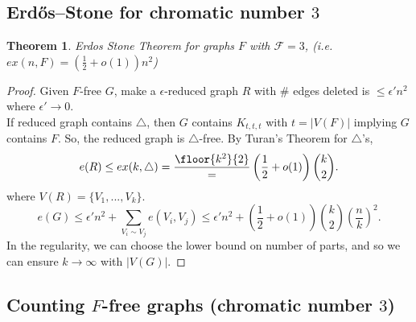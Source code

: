 \documentclass[a4paper]{article}
\newtheorem{thm}{Theorem}[section]
\begin{document}
\subsection{Erd\H{o}s--Stone for chromatic number $3$}

\begin{thm}
    Erdos Stone Theorem for graphs $F$ with $\mathcal{F}=3$, (i.e. $ex(n,F)= \left( \frac{1}{2}+o(1) \right)n^2$)
\end{thm}
\begin{proof}
    Given $F$-free $G$, make a $\epsilon$-reduced graph $R$ with $\#$ edges deleted is $\leq \epsilon'n^2$ where $\epsilon'\to 0$. \\
    If reduced graph contains $\triangle$, then $G$ contains $K_{t,t,t}$ with $t=|V(F)|$ implying $G$ contains $F$. So, the reduced graph is $\triangle$-free. By Turan's Theorem for $\triangle$'s, \[
    e(R)\leq ex(k,\triangle)=\frac{\floor{k^2}{2}}= \left( \frac{1}{2}+o(1) \right){k \choose 2}
    .\] 
    where $V(R)= \{V_1,...,V_k\}$. 
    \[
    e(G)\leq \epsilon' n^2+ \sum_{V_i\sim V_j}e(V_i,V_j)\leq \epsilon'n^2+ \left( \frac{1}{2}+o(1) \right){k \choose 2} \left (\frac{n}{k} \right)^2
    .\] 
    In the regularity, we can choose the lower bound on number of parts, and so we can ensure $k\to \infty$ with $|V(G)|$. 
\end{proof}

\subsection{Counting $F$-free graphs (chromatic number $3$)}
\end{document}
